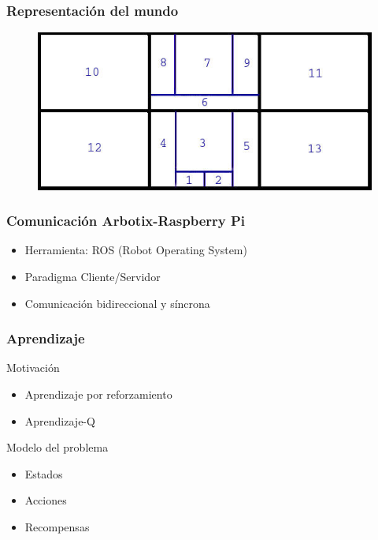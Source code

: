 \documentclass{beamer}
\begin{document}
\begin{frame}
\frametitle{Representaci\'on del mundo}
\begin{figure}[hbtp]
\centering
\includegraphics[scale=0.5]{Regiones.jpg} 
\end{figure}
\end{frame}



\begin{frame}
\frametitle{Comunicaci\'on Arbotix-Raspberry Pi}

\begin{itemize}
	\item Herramienta: ROS (Robot Operating System)
	\item Paradigma Cliente/Servidor
	\item Comunicaci\'on bidireccional y s\'incrona
\end{itemize}	

\end{frame}



\begin{frame}
\frametitle{Aprendizaje}

\begin{block}{Motivaci\'on}
\begin{itemize}
	\item Aprendizaje por reforzamiento
	\item Aprendizaje-Q
\end{itemize}
\end{block}	

\begin{block}{Modelo del problema}
\begin{itemize}
	\item Estados
	\item Acciones
	\item Recompensas
\end{itemize}
\end{block}	

\end{frame}
\end{document}
